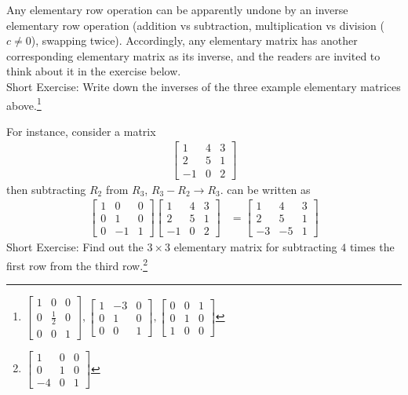 Any elementary row operation can be apparently undone by an inverse elementary row operation (addition vs subtraction, multiplication vs division ($c \neq 0$), swapping twice). Accordingly, any elementary matrix has another corresponding elementary matrix as its inverse, and the readers are invited to think about it in the exercise below. \\
Short Exercise: Write down the inverses of the three example elementary matrices above.\footnote{$
\begin{bmatrix}
1 & 0 & 0 \\
0 & \frac{1}{2} & 0 \\
0 & 0 & 1
\end{bmatrix},
\begin{bmatrix}
1 & -3 & 0 \\
0 & 1 & 0 \\
0 & 0 & 1
\end{bmatrix},
\begin{bmatrix}
0 & 0 & 1 \\
0 & 1 & 0 \\
1 & 0 & 0
\end{bmatrix}
$}\par
For instance, consider a matrix
\begin{align*}
\begin{bmatrix}
1 & 4 & 3 \\
2 & 5 & 1 \\
-1 & 0 & 2
\end{bmatrix}     
\end{align*}
then subtracting $R_2$ from $R_3$, $R_3 - R_2 \to R_3$. can be written as
\begin{align*}
\begin{bmatrix}
1 & 0 & 0 \\
0 & 1 & 0 \\
0 & -1 & 1
\end{bmatrix} 
\begin{bmatrix}
1 & 4 & 3 \\
2 & 5 & 1 \\
-1 & 0 & 2
\end{bmatrix} 
&= 
\begin{bmatrix}
1 & 4 & 3 \\
2 & 5 & 1 \\
-3 & -5 & 1
\end{bmatrix} 
\end{align*}
Short Exercise: Find out the $3 \times 3$ elementary matrix for subtracting $4$ times the first row from the third row.\footnote{$
\begin{bmatrix}
1 & 0 & 0 \\
0 & 1 & 0 \\
-4 & 0 & 1
\end{bmatrix}
$}\par
